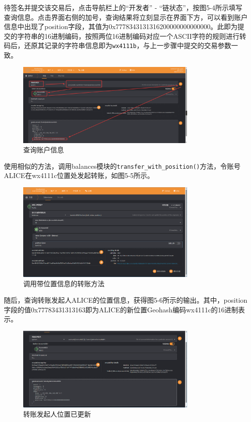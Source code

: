 待签名并提交该交易后，点击导航栏上的“开发者” - “链状态”，按图5-4所示填写查询信息。点击界面右侧的加号，查询结果将立刻显示在界面下方，可以看到账户信息中出现了position字段，其值为0x7778343131316200000000000000。此即为提交的字符串的16进制编码，按照两位16进制编码对应一个ASCII字符的规则进行转码后，还原其记录的字符串信息即为\verb|wx4111b|，与上一步骤中提交的交易参数一致。

\begin{figure}[htbp]
    \centering
    \includegraphics[width=0.8\textwidth]{images/watchAccInfo.png}
    \caption{查询账户信息}\label{查询账户信息} %
\end{figure}

使用相似的方法，调用balances模块的\verb|transfer_with_position()|方法，令账号ALICE在wx4111c位置处发起转账，如图5-5所示。

\begin{figure}[htbp]
    \centering
    \includegraphics[width=0.8\textwidth]{images/transWithPos.png}
    \caption{调用带位置信息的转账方法}\label{调用带位置信息的转账方法} %
\end{figure}

随后，查询转账发起人ALICE的位置信息，获得图5-6所示的输出。其中，position字段的值0x77783431313163即为ALICE的新位置Geohash编码wx4111c的16进制表示。

\begin{figure}[htbp]
    \centering
    \includegraphics[width=0.8\textwidth]{images/transWithPosResult.png}
    \caption{转账发起人位置已更新}\label{转账发起人位置已更新} %
\end{figure}

